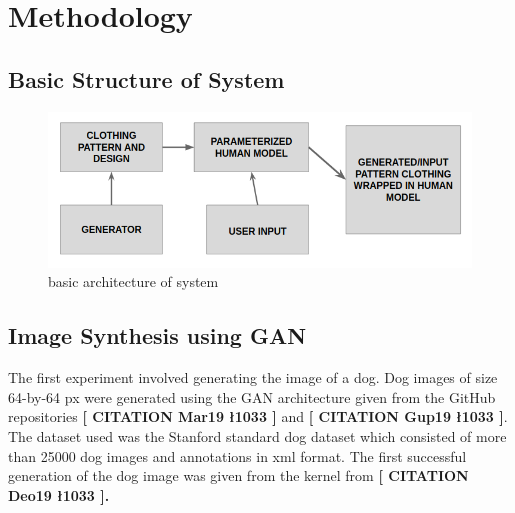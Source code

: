 \documentclass{article}
\begin{document}
\newpage
\section{Methodology}

    \subsection{Basic Structure of System}
        \begin{figure}[h]
            \centering
            \includegraphics[scale=0.75]{images/basicArchitecture.png}
            \caption{basic architecture of system}
        \end{figure}
     
    
    \subsection{Image Synthesis using GAN}
    
    The first experiment involved generating the image of a dog. Dog images of size 64-by-64 px were generated using the GAN architecture given from the GitHub repositories \textbf{[ CITATION Mar19 \l 1033 ]} and \textbf{[ CITATION Gup19 \l 1033 ]}. The dataset used was the Stanford standard dog dataset which consisted of more than 25000 dog images and annotations in xml format. The first successful generation of the dog image was given from the kernel from \textbf{[ CITATION Deo19 \l 1033 ].}
    
\end{document}
